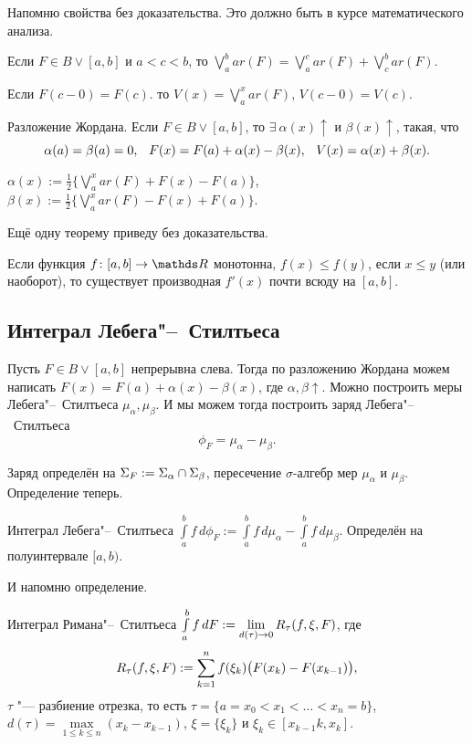 Напомню свойства без доказательства. Это должно быть в курсе математического анализа.
\begin{Ut}
  Если $F\in B\vee[a,b]$ и $a<c<b$, то $\bigvee\limits_a^bar(F) = \bigvee\limits_a^car(F)+\bigvee\limits_c^bar(F)$.
\end{Ut}
\begin{Ut}
  Если $F(c-0) = F(c)$. то $V(x)=\bigvee\limits_a^xar(F)$, $V(c-0)=V(c)$.
\end{Ut}
\begin{Ut}
  Разложение Жордана. Если $F\in B\vee [a,b]$, то $\exists\ \alpha(x)\uparrow$ и $\beta(x)\uparrow$, такая, что
\[
  \alpha(a)=\beta(a)=0,\hskip .75em plus.1em minus.08em\relax F(x) = F(a)+\alpha(x)-\beta(x),\hskip .75em plus.1em minus.08em\relax V(x) = \alpha(x)+\beta(x).
\]
\end{Ut}
\begin{Proof}
  $\alpha(x):=\frac12\big\{ \bigvee_a^xar(F)+F(x)-F(a)\big\}$, $\beta(x):=\frac12\big\{\bigvee_a^xar(F)-F(x)+F(a)\big\}$.
\end{Proof}

Ещё одну теорему приведу без доказательства.
\begin{The}
  Если функция $f\colon [a,b]\to\R$ монотонна, $f(x)\le f(y)$, если $x\le y$ (или наоборот), то существует производная $f'(x)$ почти всюду на $[a,b]$.
\end{The}

\subsection{Интеграл Лебега"--~Стилтьеса}
  Пусть $F\in B\vee [a,b]$ непрерывна слева. Тогда по разложению Жордана можем написать $F(x)=F(a)+\alpha(x)-\beta(x)$, где $\alpha,\beta\uparrow$. Можно построить меры Лебега"--~Стилтьеса $\mu_\alpha,\mu_\beta$. И мы можем тогда построить заряд Лебега"--~Стилтьеса
\[
  \phi_F = \mu_\alpha-\mu_\beta.
\]

Заряд определён на $\Sigma_F:=\Sigma_\alpha\cap\Sigma_\beta$, пересечение $\sigma$-алгебр мер $\mu_\alpha$ и $\mu_\beta$. Определение теперь.

\begin{Def}
  Интеграл Лебега"--~Стилтьеса $\int\limits_a^b f\,d\phi_F:=\int\limits_a^bf\,d\mu_\alpha-\int\limits_a^bf\,d\mu_\beta$. Определён на полуинтервале $[a,b)$.
\end{Def}
 И напомню определение.
\begin{Def}
  Интеграл Римана"--~Стилтьеса $\int\limits_a^bf\,d F :=\lim\limits_{d(\tau)\rightarrow0} R_\tau(f,\xi,F)$, где 
\[R_\tau(f,\xi,F):=\sum\limits_{k = 1}^{n} f(\xi_k)\big(F(x_k)-F(x_{k-1})\big),\]
 $\tau$ "--- разбиение отрезка, то есть $\tau = \{a=x_0<x_1<\dots<x_n=b\}$, $d(\tau) = \max\limits_{1\le k\le n}(x_k-x_{k-1})$, $\xi = \{\xi_k\}$ и $\xi_k\in[x_{k-1}k,x_{k}]$.
\end{Def}

